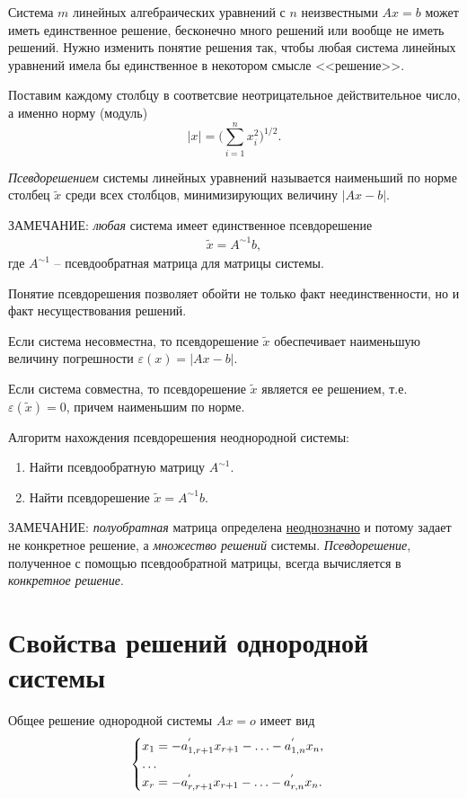 \documentclass[%
	11pt,
	a4paper,
	utf8,
		]{article}
\begin{document}
Система $ m $ линейных алгебраических уравнений с $ n $ неизвестными $ A x = b $ может иметь единственное решение, бесконечно много решений или вообще не иметь решений. Нужно изменить понятие решения так, чтобы любая система линейных уравнений имела бы единственное в некотором смысле <<решение>>.

Поставим каждому столбцу в соответсвие неотрицательное действительное число, а именно норму (модуль)
$$
| x | = \Big(\sum\limits_{i=1}^{n} x_i^2 \Big)^{1/2}.
$$

\emph{Псевдорешением} системы линейных уравнений называется наименьший по норме столбец $ \tilde{x} $ среди всех столбцов, минимизирующих величину $ |A x - b | $.

ЗАМЕЧАНИЕ: \emph{любая} система имеет единственное псевдорешение \cite[]{bortakovskiy:2005}
\begin{align*}
	\tilde{x} = A^{\sim 1} b,
\end{align*}
где $ A^{\sim 1} $ -- псевдообратная матрица для матрицы системы.

Понятие псевдорешения позволяет обойти не только факт неединственности, но и факт несуществования решений.

Если система несовместна, то псевдорешение $ \tilde{x} $ обеспечивает наименьшую величину погрешности $ \varepsilon(x) = | A x - b | $.

Если система совместна, то псевдорешение $ \tilde{x} $ является ее решением, т.е. $ \varepsilon(\tilde{x}) = 0 $, причем наименьшим по норме.

Алгоритм нахождения псевдорешения неоднородной системы:
\begin{enumerate}
	\item Найти псевдообратную матрицу $ A^{\sim 1} $.
	
	\item Найти псевдорешение $ \tilde{x} = A^{\sim 1} b $.
\end{enumerate}

ЗАМЕЧАНИЕ: \emph{полуобратная} матрица определена \underline{неоднозначно} и потому задает не конкретное решение, а \emph{множество решений} системы. \emph{Псевдорешение}, полученное с помощью псевдообратной матрицы, всегда вычисляется в \emph{конкретное решение}.


\section{Свойства решений однородной системы}

Общее решение однородной системы $ Ax = o $ имеет вид \cite[]{bortakovskiy:2005}
\begin{align*}
	\begin{cases}
		x_1 = -a_{1, r + 1}^{'} x_{r + 1} - \ldots - a_{1,n}^{'}x_n,\\
		{\centering \ldots} \\
		x_r = -a_{r, r + 1}^{'} x_{r + 1} - \ldots - a_{r,n}^{'} x_n.
	\end{cases}
\end{align*}
\end{document}
